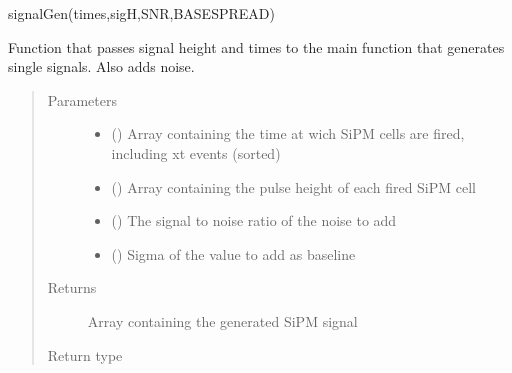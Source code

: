 \documentclass[letterpaper,10pt,english]{sphinxmanual}
\begin{document}
\begin{fulllineitems}
\label{\detokenize{structure:libs.libCPU.SiPMSignalAction}}
signalGen(times,sigH,SNR,BASESPREAD)

Function that passes signal height and times to the main function that
generates single signals. Also adds noise.
\begin{quote}\begin{description}
\item[{Parameters}] \leavevmode\begin{itemize}
\item {} 
 () \textendash{} Array containing the time at wich SiPM cells are fired, including xt events (sorted)

\item {} 
 () \textendash{} Array containing the pulse height of each fired SiPM cell

\item {} 
 () \textendash{} The signal to noise ratio of the noise to add

\item {} 
 () \textendash{} Sigma of the value to add as baseline

\end{itemize}

\item[{Returns}] \leavevmode
{} \textendash{} Array containing the generated SiPM signal

\item[{Return type}] \leavevmode
{}

\end{description}\end{quote}

\end{fulllineitems}

\end{document}
